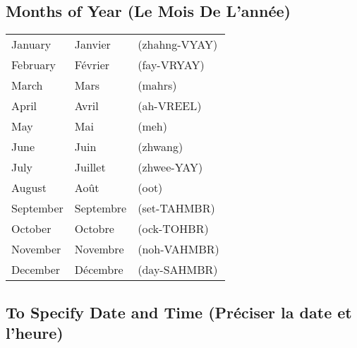 \subsection{Months of Year (Le Mois De L'ann\'ee)}

\begin{tabular}{| l | l | l |}
\hline
January     & Janvier       & (zhahng-VYAY) \\
February    & F\'evrier     & (fay-VRYAY)   \\
March       & Mars          & (mahrs)       \\
April       & Avril         & (ah-VREEL)    \\
May         & Mai           & (meh)         \\
June        & Juin          & (zhwang)      \\
July        & Juillet       & (zhwee-YAY)   \\
August      & Ao\^ut        & (oot)         \\
September   & Septembre     & (set-TAHMBR)  \\
October     & Octobre       & (ock-TOHBR)   \\
November    & Novembre      & (noh-VAHMBR)  \\
December    & D\'ecembre    & (day-SAHMBR)  \\
\hline
\end{tabular}

\subsection{To Specify Date and Time (Pr\'eciser la date et l'heure)}

